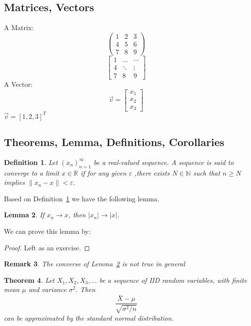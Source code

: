 \documentclass{article} %
\newtheorem{definition}{Definition}[section]
\newtheorem{theorem}[definition]{Theorem}
\newtheorem{lemma}[definition]{Lemma}
\newtheorem{remark}[definition]{Remark}
\begin{document}
		\subsection{Matrices, Vectors}
			A Matrix:
			\begin{equation}
			\begin{pmatrix}
			1 & 2 & 3\\
			4 & 5 & 6\\
			7 & 8 & 9
			\end{pmatrix}
			\end{equation}
			$$\begin{bmatrix}
			 1 & \dots & \cdots\\
			4 & \ddots & \vdots\\
			7 & 8 & 9
			\end{bmatrix}$$
			A Vector:
			\begin{equation}
			\vec{v} =
			\begin{bmatrix}
			x_{1}\\
			x_{2}\\
			x_{3}
			\end{bmatrix}
			\end{equation}
			$\vec{v} = [1,2,3]^{T}$
			
		\subsection{Theorems, Lemma, Definitions, Corollaries}
			\begin{definition}\label{convergence} %
				Let $(x_{n})_{n=1}^{\infty}$ be a real-valued sequence. A sequence is said to converge to a limit $x \in \mathbb{R}$ if for any given $\varepsilon$ ,there exists $N \in\mathbb{N}$ such that $n \geq N$ implies $\|x_{n}-x\|<\varepsilon$. 
			\end{definition}
			Based on Definition~\ref{convergence} we have the following lemma. %
			\begin{lemma}\label{simple lemma}
			If $x_{n} \to x$, then $|x_{n}| \to |x|$.
			\end{lemma}
			We can prove this lemma by:
			\begin{proof}
			Left as an exercise.
			\end{proof}
			\begin{remark}
			The converse of Lemma~\ref{simple lemma} is not true in general
			\end{remark}
			\begin{theorem}
			Let $X_{1}, X_{2}, X_{3}, \dots$ be a sequence of IID random variables, with finite mean $\mu$ and variance $\sigma^{2}$. Then
				\begin{equation}
					\frac{\bar{X}-\mu}{\sqrt{\sigma^{2}/n}} 
				\end{equation}
				can be approximated by the standard normal distribution.
			\end{theorem}
\end{document}
